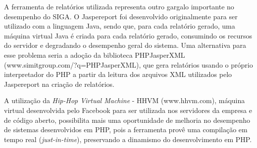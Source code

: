 A ferramenta de relatórios utilizada representa outro gargalo importante no 
desempenho do SIGA. O Jaspereport foi desenvolvido originalmente para ser 
utilizado com a linguagem Java, sendo que, para cada relatório gerado, uma 
máquina virtual Java é criada para cada relatório gerado, consumindo os 
recursos do servidor e degradando o desempenho geral do sistema. Uma 
alternativa para esse problema seria a adoção da biblioteca PHPJasperXML 
(www.simitgroup.com/?q=PHPJasperXML), que gera relatórios usando o próprio 
interpretador do PHP a partir da leitura dos arquivos XML utilizados 
pelo Jaspereport na criação de relatórios.

A utilização da \textit{Hip-Hop Virtual Machine} - HHVM (www.hhvm.com), máquina 
virtual desenvolvida pelo Facebook para ser utilizada nos servidores da empresa 
e de código aberto, possibilita mais uma oportunidade de melhoria no desempenho 
de sistemas desenvolvidos em PHP, pois a ferramenta provê uma compilação em 
tempo real (\textit{just-in-time}), preservando a dinamismo do desenvolvimento 
em PHP.
